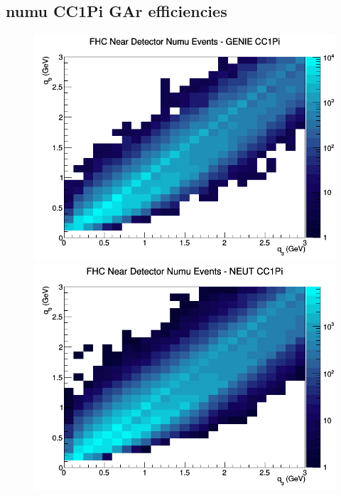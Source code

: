 \documentclass[12pt]{article}
\begin{document}
\subsection{numu CC1Pi GAr efficiencies}
\begin{figure}[h]
\includegraphics[width=\linewidth]{eff_q0_q3/GAr/CC1Pi_FHC_ND_numu_q3_q0_GENIE.png}
\endminipage
{}
\includegraphics[width=\linewidth]{eff_q0_q3/GAr/CC1Pi_FHC_ND_numu_q3_q0_NEUT.png}
\endminipage
{}

\end{figure}
\end{document}
